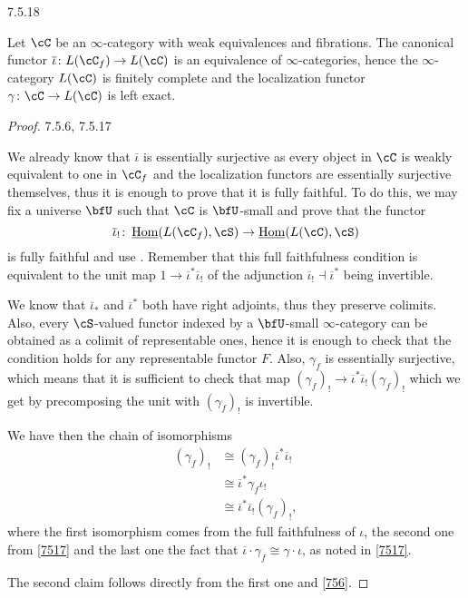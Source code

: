 \documentclass[a4paper,fontsize=12pt]{scrartcl}
\begin{document}
\begin{prop}\label{7518}
  7.5.18

  Let $\cC$ be an $\infty$-category with weak equivalences and fibrations. The
  canonical functor $\overline{\iota}\colon L(\cC_f)\rightarrow L(\cC)$ is an
  equivalence of $\infty$-categories, hence the $\infty$-category $L(\cC)$ is
  finitely complete and the localization functor $\gamma\colon\cC\rightarrow
  L(\cC)$ is left exact.
\end{prop}
\begin{proof}
  7.5.6, 7.5.17

  We already know that $\overline{\iota}$ is essentially surjective as every
  object in $\cC$ is weakly equivalent to one in $\cC_f$ and the localization
  functors are essentially surjective themselves, thus it is enough to prove
  that it is fully faithful. To do this, we may fix a universe $\bfU$ such that
  $\cC$ is $\bfU$-small and prove that the functor
  \[\overline{\iota}_!\colon\Home(L(\cC_f),\cS)\rightarrow\Home(L(\cC),\cS)\]
  is fully faithful and use \cite[Prop.\ 6.1.15]{Cis19}. Remember that this full
  faithfulness condition is equivalent to the unit map
  $1\rightarrow\overline{\iota}^*\overline{\iota}_!$ of the adjunction
  $\overline{\iota}_!\dashv\overline{\iota}^*$ being invertible.

  We know that $\overline{\iota}_*$ and $\overline{\iota}^*$ both have right
  adjoints, thus they preserve colimits. Also, every $\cS$-valued functor
  indexed by a $\bfU$-small $\infty$-category can be obtained as a colimit of
  representable ones, hence it is enough to check that the condition holds for
  any representable functor $F$. Also, $\gamma_f$ is essentially surjective,
  which means that it is sufficient to check that map
  $(\gamma_f)_!\rightarrow\overline{\iota}^*\overline{\iota}_!(\gamma_f)_!$
  which we get by precomposing the unit with $(\gamma_f)_!$ is invertible.

  We have then the chain of isomorphisms
  \begin{align*}
    (\gamma_f)_! &\cong(\gamma_f)_!\overline{\iota}^*\overline{\iota}_! \\
                 &\cong\overline{\iota}^*\gamma_f\iota_! \\
                 &\cong\overline{\iota}^*\overline{\iota}_!(\gamma_f)_!,
  \end{align*}
  where the first isomorphism comes from the full faithfulness of $\iota$, the
  second one from \ref{7517} and the last one the fact that
  $\overline{\iota}\cdot\gamma_f\cong\gamma\cdot\iota$, as noted in \ref{7517}.

  The second claim follows directly from the first one and \ref{756}.
\end{proof}
\end{document}

